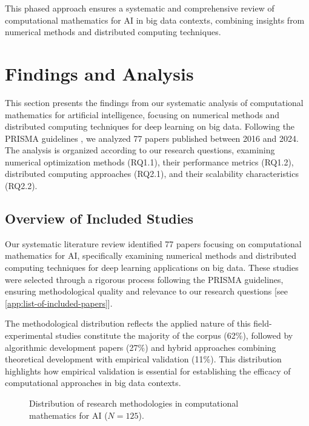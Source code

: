 \documentclass[acmsmall]{acmart}
\begin{document}
This phased approach ensures a systematic and comprehensive review of computational mathematics for AI in big data contexts, combining insights from numerical methods and distributed computing techniques.

\section{Findings and Analysis}\label{sec:findings-and-analysis}
This section presents the findings from our systematic analysis of computational mathematics for artificial intelligence, focusing on numerical methods and distributed computing techniques for deep learning on big data. Following the PRISMA guidelines \citet{moher2009preferred}, we analyzed 77 papers published between 2016 and 2024. The analysis is organized according to our research questions, examining numerical optimization methods (RQ1.1), their performance metrics (RQ1.2), distributed computing approaches (RQ2.1), and their scalability characteristics (RQ2.2).


\subsection{Overview of Included Studies}\label{subsec:overview-of-included-studies}
Our systematic literature review identified 77 papers focusing on computational mathematics for AI, specifically examining numerical methods and distributed computing techniques for deep learning applications on big data. These studies were selected through a rigorous process following the PRISMA guidelines, ensuring methodological quality and relevance to our research questions [see \cref{app:list-of-included-papers}].

The methodological distribution reflects the applied nature of this field-experimental studies constitute the majority of the corpus (62\%), followed by algorithmic development papers (27\%) and hybrid approaches combining theoretical development with empirical validation (11\%). This distribution highlights how empirical validation is essential for establishing the efficacy of computational approaches in big data contexts.

\begin{figure}[ht]
    \centering
    \caption{Distribution of research methodologies in computational mathematics for AI ($N=125$).}
    \label{fig:methodology_distribution}
\end{figure}
\end{document}
